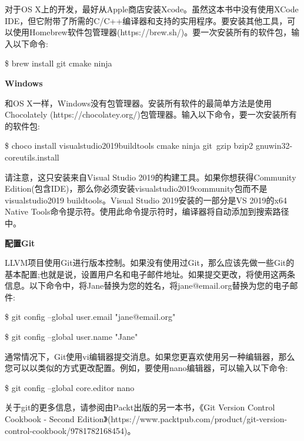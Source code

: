 对于OS X上的开发，最好从Apple商店安装Xcode。虽然这本书中没有使用XCode IDE，但它附带了所需的C/C++编译器和支持的实用程序。要安装其他工具，可以使用Homebrew软件包管理器(https://brew.sh/)。要一次安装所有的软件包，输入以下命令:\par

\begin{tcolorbox}[colback=white,colframe=black]
	\$ brew install git cmake ninja
\end{tcolorbox}

\hspace*{\fill} \par %
\textbf{Windows}

和OS X一样，Windows没有包管理器。安装所有软件的最简单方法是使用Chocolately (https://chocolatey.org/)包管理器。输入以下命令，要一次安装所有的软件包:\par

\begin{tcolorbox}[colback=white,colframe=black]
\$ choco install visualstudio2019buildtools cmake ninja git\
	gzip bzip2 gnuwin32-coreutils.install
\end{tcolorbox}

请注意，这只安装来自Visual Studio 2019的构建工具。如果你想获得Community Edition(包含IDE)，那么你必须安装visualstudio2019community包而不是visualstudio2019 buildtools。Visual Studio 2019安装的一部分是VS 2019的x64 Native Tools命令提示符。使用此命令提示符时，编译器将自动添加到搜索路径中。\par

\hspace*{\fill} \par %
\textbf{配置Git}

LLVM项目使用Git进行版本控制。如果没有使用过Git，那么应该先做一些Git的基本配置;也就是说，设置用户名和电子邮件地址。如果提交更改，将使用这两条信息。以下命令中，将Jane替换为您的姓名，将jane@email.org替换为您的电子邮件:\par

\begin{tcolorbox}[colback=white,colframe=black]
	\$ git config --global user.email "jane@email.org"
\end{tcolorbox}

\begin{tcolorbox}[colback=white,colframe=black]
	\$ git config --global user.name "Jane"
\end{tcolorbox}

通常情况下，Git使用vi编辑器提交消息。如果您更喜欢使用另一种编辑器，那么您可以以类似的方式更改配置。例如，要使用nano编辑器，可以输入以下命令:\par

\begin{tcolorbox}[colback=white,colframe=black]
	\$ git config --global core.editor nano
\end{tcolorbox}

关于git的更多信息，请参阅由Packt出版的另一本书，《Git Version Control Cookbook - Second Edition》(https://www.packtpub.com/product/git-version-control-cookbook/9781782168454)。\par






